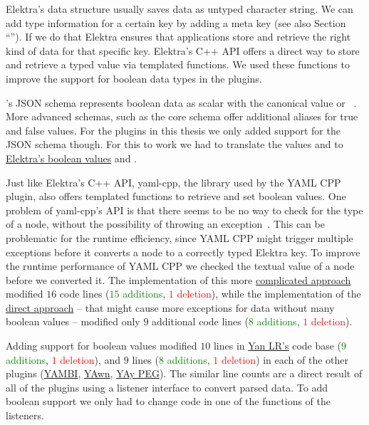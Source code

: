 Elektra’s  data structure usually saves data as untyped character string. We can add type information for a certain key by adding a  meta key (see also Section “”). If we do that Elektra ensures that applications store and retrieve the right kind of data for that specific key. Elektra’s C++ \gls{API} offers a direct way to store and retrieve a typed value via templated functions. We used these functions to improve the support for boolean data types in the  plugins.

’s JSON schema represents boolean data as scalar with the canonical value  or ~\cite{ben2009yaml}. More advanced schemas, such as the core schema offer additional aliases for true and false values. For the  plugins in this thesis we only added support for the JSON schema though. For this to work we had to translate the  values  and  to \href{https://master.libelektra.org/doc/decisions/bool.md}{Elektra’s boolean values}  and .

Just like Elektra’s C++ \gls{API}, yaml-cpp, the library used by the YAML CPP plugin, also offers templated functions to retrieve and set boolean values. One problem of yaml-cpp’s \gls{API} is that there seems to be no way to check for the type of a  node, without the possibility of throwing an exception~\cite{beder2013type}. This can be problematic for the runtime efficiency, since YAML CPP might trigger multiple exceptions before it converts a  node to a correctly typed Elektra key. To improve the runtime performance of YAML CPP we checked the textual value of a  node before we converted it. The implementation of this more \href{https://github.com/ElektraInitiative/libelektra/commit/d4e62eebd006ea4b066c75e6e885ee5a4b6e26cf#diff-4bdb640234f370e3a9db751e1f7d769b}{complicated approach} modified $16$ code lines (\textcolor{Green}{$15$ additions}, \textcolor{Red}{$1$ deletion}), while the implementation of the \href{https://github.com/ElektraInitiative/libelektra/commit/1e9a07baad8a140c6eda654053db450c0901f5d0#diff-4bdb640234f370e3a9db751e1f7d769b}{direct approach} – that might cause more exceptions for data without many boolean values – modified only $9$ additional code lines (\textcolor{Green}{$8$ additions}, \textcolor{Red}{$1$ deletion}).

Adding support for boolean values modified $10$ lines in \href{https://issues.libelektra.org/2653}{Yan LR’s} code base (\textcolor{Green}{$9$ additions}, \textcolor{Red}{$1$ deletion}), and $9$ lines (\textcolor{Green}{$8$ additions}, \textcolor{Red}{$1$ deletion}) in each of the other plugins (\href{https://issues.libelektra.org/2652}{YAMBI}, \href{https://issues.libelektra.org/2651}{YAwn}, \href{https://issues.libelektra.org/2654}{YAy PEG}). The similar line counts are a direct result of all of the plugins using a listener interface to convert parsed  data. To add boolean support we only had to change code in one of the functions of the listeners.

